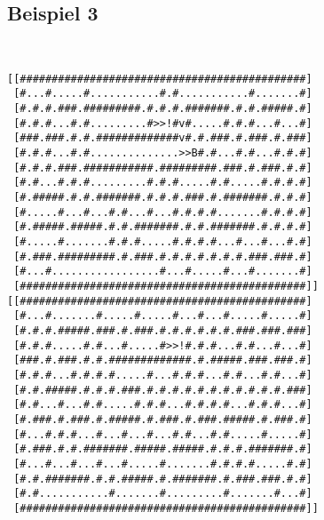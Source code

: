 \documentclass[a4paper,10pt,ngerman]{scrartcl}
\begin{document}
\subsection{Beispiel 3}\mbox{}\\
\begin{lstlisting}[frame=tb]
[[#############################################]
 [#...#.....#...........#.#...........#.......#]
 [#.#.#.###.#########.#.#.#.#######.#.#.#####.#]
 [#.#.#...#.#.........#>>!#v#.....#.#.#...#...#]
 [###.###.#.#.#############v#.#.###.#.###.#.###]
 [#.#.#...#.#..............>>B#.#...#.#...#.#.#]
 [#.#.#.###.###########.#########.###.#.###.#.#]
 [#.#...#.#.#.........#.#.#.....#.#.....#.#.#.#]
 [#.#####.#.#.#######.#.#.#.###.#.#######.#.#.#]
 [#.....#...#...#.#...#...#.#.#.#.......#.#.#.#]
 [#.#####.#####.#.#.#######.#.#.#######.#.#.#.#]
 [#.....#.......#.#.#.....#.#.#.#...#...#...#.#]
 [#.###.#########.#.###.#.#.#.#.#.#.#.###.###.#]
 [#...#.................#...#.....#...#.......#]
 [#############################################]]
[[#############################################]
 [#...#.......#.....#.....#...#...#.....#.....#]
 [#.#.#.#####.###.#.###.#.#.#.#.#.#.###.###.###]
 [#.#.#.....#.#...#.....#>>!#.#.#...#.#...#...#]
 [###.#.###.#.#.#############.#.#####.###.###.#]
 [#.#.#...#.#.#.#.....#...#.#.#...#.#...#.#...#]
 [#.#.#####.#.#.#.###.#.#.#.#.#.#.#.#.#.#.#.###]
 [#.#...#...#.#.....#.#.#...#.#.#.#...#.#.#...#]
 [#.###.#.###.#.#####.#.###.#.###.#####.#.###.#]
 [#...#.#.#...#...#...#...#.#...#.#.....#.....#]
 [#.###.#.#.#######.#####.#####.#.#.#.#######.#]
 [#...#...#...#...#.....#.......#.#.#.#.....#.#]
 [#.#.#######.#.#.#####.#.#######.#.###.###.#.#]
 [#.#...........#.......#.........#.......#...#]
 [#############################################]]
\end{lstlisting}
\end{document}
